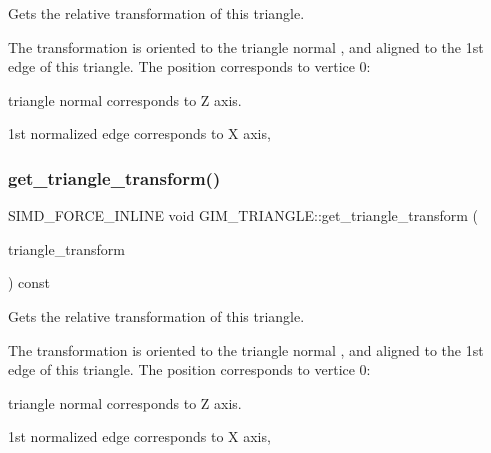 Gets the relative transformation of this triangle. 

The transformation is oriented to the triangle normal , and aligned to the 1st edge of this triangle. The position corresponds to vertice 0\+:
\begin{DoxyItemize}
\item triangle normal corresponds to Z axis.
\item 1st normalized edge corresponds to X axis, 
\end{DoxyItemize}\mbox{\label{classGIM__TRIANGLE_a45e2c6e131c368afa12e210cf9166fbb}} 
\subsubsection{\texorpdfstring{get\+\_\+triangle\+\_\+transform()}{get\_triangle\_transform()}\hspace{0.1cm}{\footnotesize\ttfamily [2/2]}}
{\footnotesize\ttfamily S\+I\+M\+D\+\_\+\+F\+O\+R\+C\+E\+\_\+\+I\+N\+L\+I\+NE void G\+I\+M\+\_\+\+T\+R\+I\+A\+N\+G\+L\+E\+::get\+\_\+triangle\+\_\+transform (\begin{DoxyParamCaption}\item[{bt\+Transform \&}]{triangle\+\_\+transform }\end{DoxyParamCaption}) const\hspace{0.3cm}{\ttfamily [inline]}}



Gets the relative transformation of this triangle. 

The transformation is oriented to the triangle normal , and aligned to the 1st edge of this triangle. The position corresponds to vertice 0\+:
\begin{DoxyItemize}
\item triangle normal corresponds to Z axis.
\item 1st normalized edge corresponds to X axis, 
\end{DoxyItemize}\mbox{\label{classGIM__TRIANGLE_aa35a00f5c7b9eeb8f0656be929294504}} 
